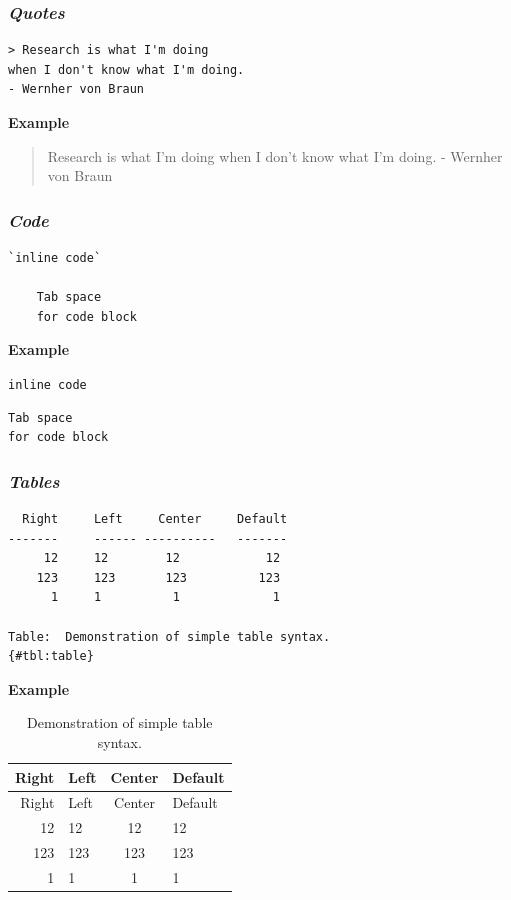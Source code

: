 \documentclass[journal,10pt,final]{IEEEtran}
\begin{document}
\subsubsection{\texorpdfstring{\textbf{\emph{Quotes}}}{Quotes}}\label{quotes}

\begin{verbatim}
> Research is what I'm doing
when I don't know what I'm doing.
- Wernher von Braun
\end{verbatim}

\textbf{Example}

\begin{quote}
Research is what I'm doing when I don't know what I'm doing. - Wernher
von Braun
\end{quote}

\subsubsection{\texorpdfstring{\textbf{\emph{Code}}}{Code}}\label{code}

\begin{verbatim}
`inline code`

    Tab space
    for code block
\end{verbatim}

\textbf{Example}

\texttt{inline\ code}

\begin{verbatim}
Tab space
for code block
\end{verbatim}

\subsubsection{\texorpdfstring{\textbf{\emph{Tables}}}{Tables}}\label{tables}

\begin{verbatim}
  Right     Left     Center     Default
-------     ------ ----------   -------
     12     12        12            12
    123     123       123          123
      1     1          1             1

Table:  Demonstration of simple table syntax.
{#tbl:table}
\end{verbatim}

\textbf{Example}

\begin{longtable}[c]{@{}rlcl@{}}
\caption{Demonstration of simple table
syntax.\label{tbl:table}}\tabularnewline
\toprule
Right & Left & Center & Default\tabularnewline
\midrule
\endfirsthead
\toprule
Right & Left & Center & Default\tabularnewline
\midrule
\endhead
12 & 12 & 12 & 12\tabularnewline
123 & 123 & 123 & 123\tabularnewline
1 & 1 & 1 & 1\tabularnewline
\bottomrule
\end{longtable}
\end{document}
